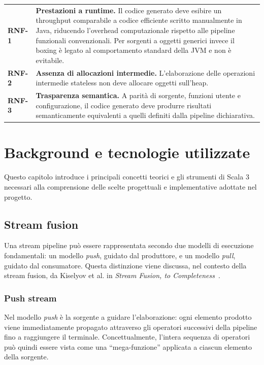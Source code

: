 \documentclass[a4paper,11pt]{report}
\theoremstyle{definition}
\begin{document}
\begin{longtable}{@{}p{}p{}@{}}
  \textbf{RNF-1} &
  \textbf{Prestazioni a runtime.}
  Il codice generato deve esibire un throughput comparabile a codice efficiente scritto manualmente in Java, riducendo l'overhead computazionale rispetto alle pipeline funzionali convenzionali. Per sorgenti a oggetti generici invece il boxing è legato al comportamento standard della JVM e non è evitabile.
  \\[0.5em]

  \textbf{RNF-2} &
  \textbf{Assenza di allocazioni intermedie.}
  L'elaborazione delle operazioni intermedie stateless non deve allocare oggetti sull'heap.
  \\[0.5em]

  \textbf{RNF-3} &
  \textbf{Trasparenza semantica.}
  A parità di sorgente, funzioni utente e configurazione, il codice generato deve produrre risultati semanticamente equivalenti a quelli definiti dalla pipeline dichiarativa.
\end{longtable}

\chapter{Background e tecnologie utilizzate}
\label{chap:metaprogramming}
Questo capitolo introduce i principali concetti teorici e gli strumenti di Scala 3 necessari alla comprensione delle scelte progettuali e implementative adottate nel progetto.
\section{Stream fusion}
Una stream pipeline può essere rappresentata secondo due modelli di esecuzione fondamentali: un modello \emph{push}, guidato dal produttore, e un modello \emph{pull}, guidato dal consumatore. Questa distinzione viene discussa, nel contesto della stream fusion, da Kiselyov et al. in \emph{Stream Fusion, to Completeness}~\cite{kiselyov2017stream}.

\subsection{Push stream}
\label{subsec:pushstream}
Nel modello \emph{push} è la sorgente a guidare l'elaborazione: ogni elemento prodotto viene immediatamente propagato attraverso gli operatori successivi della pipeline fino a raggiungere il terminale. Concettualmente, l'intera sequenza di operatori può quindi essere vista come una ``mega-funzione'' applicata a ciascun elemento della sorgente.
\end{document}
